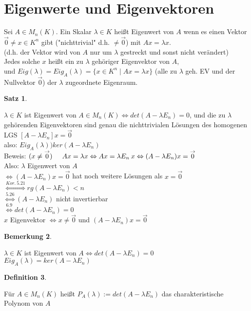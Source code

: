 \documentclass[a4paper,11pt]{article}
\newtheorem{definition}{Definition}[section]
\newtheorem{satz}[definition]{Satz}
\newtheorem{bem}[definition]{Bemerkung}
\begin{document}
\section{Eigenwerte und Eigenvektoren}
Sei $A\in M_n(K).$ Ein Skalar $\lambda\in K$ heißt Eigenwert von $A$ wenn es einen Vektor $\overset{\rightarrow}{0}\neq x\in K^n$ gibt ("nichttrivial" d.h. $\neq\overset{\rightarrow}{0}$) mit $Ax=\lambda x$. \\
(d.h. der Vektor wird von $A$ nur um $\lambda$ gestreckt und sonst nicht verändert) \\
Jedes solche $x$ heißt ein zu $\lambda$ gehöriger Eigenvektor von $A$, \\
und $Eig(\lambda)=Eig_A(\lambda)=\{x\in K^n\mid Ax=\lambda x\}$ (alle zu $\lambda$ geh. EV und der Nullvektor $\overset{\rightarrow}{0}$) der $\lambda$ zugeordnete Eigenraum. 
\begin{satz}
\end{satz}
$\lambda\in K$ ist Eigenwert von $A\in M_n(K)\Leftrightarrow det(A-\lambda E_n)=0$, und die zu $\lambda$ gehörenden Eigenvektoren sind genau die nichttrivialen Lösungen des homogenen LGS $[A-\lambda E_n]x=\overset{\rightarrow}{0}$ \\
also: $Eig_A(\lambda))ker(A-\lambda E_n)$ \\
Beweis: $(x\neq\overset{\rightarrow}{0})\hspace{5mm}Ax=\lambda x\Leftrightarrow Ax=\lambda E_n\:x\Leftrightarrow(A-\lambda E_n)x=\overset{\rightarrow}{0}$ \\
Also: $\lambda$ Eigenwert von $A$ \\
$\Leftrightarrow(A-\lambda E_n)x=\overset{\rightarrow}{0}$ hat noch weitere Lösungen als $x=\overset{\rightarrow}{0}$ \\
$\overset{Kor.\:5.21}{\Leftrightarrow}rg(A-\lambda E_n)<n$ \\
$\overset{5.26}{\Leftrightarrow}(A-\lambda E_n)$ nicht invertierbar \\
$\overset{6.9}{\Leftrightarrow}det(A-\lambda E_n)=0$ \\
$x$ Eigenvektor $\Leftrightarrow x\neq\overset{\rightarrow}{0}$ und $(A-\lambda E_n)x=\overset{\rightarrow}{0}$
\begin{bem}
\end{bem}
$\lambda\in K$ ist Eigenwert von $A\Leftrightarrow det(A-\lambda E_n)=0$ \\
$Eig_A(\lambda)=ker(A-\lambda E_n)$
\begin{definition}
\end{definition}
Für $A\in M_n(K)$ heißt $P_A(\lambda):=det(A-\lambda E_n)$ das charakteristische Polynom von $A$
\end{document}
